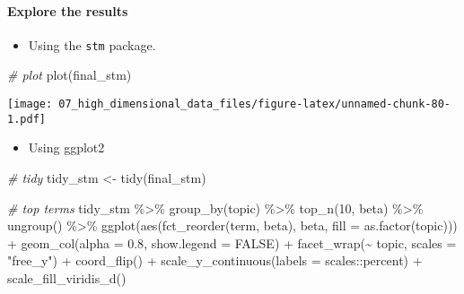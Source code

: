 \documentclass[
]{book}
\newenvironment{Shaded}{\begin{snugshade}}{\end{snugshade}}
\newcommand{\AttributeTok}[1]{\textcolor[rgb]{0.77,0.63,0.00}{#1}}
\newcommand{\CommentTok}[1]{\textcolor[rgb]{0.56,0.35,0.01}{\textit{#1}}}
\newcommand{\ConstantTok}[1]{\textcolor[rgb]{0.00,0.00,0.00}{#1}}
\newcommand{\DecValTok}[1]{\textcolor[rgb]{0.00,0.00,0.81}{#1}}
\newcommand{\FloatTok}[1]{\textcolor[rgb]{0.00,0.00,0.81}{#1}}
\newcommand{\FunctionTok}[1]{\textcolor[rgb]{0.00,0.00,0.00}{#1}}
\newcommand{\NormalTok}[1]{#1}
\newcommand{\OtherTok}[1]{\textcolor[rgb]{0.56,0.35,0.01}{#1}}
\newcommand{\SpecialCharTok}[1]{\textcolor[rgb]{0.00,0.00,0.00}{#1}}
\newcommand{\StringTok}[1]{\textcolor[rgb]{0.31,0.60,0.02}{#1}}
\providecommand{\tightlist}{%
  \setlength{\itemsep}{0pt}\setlength{\parskip}{0pt}}
\begin{document}
\hypertarget{explore-the-results}{%
\paragraph{Explore the results}\label{explore-the-results}}

\begin{itemize}
\tightlist
\item
  Using the \texttt{stm} package.
\end{itemize}

\begin{Shaded}
\begin{Highlighting}[]
\CommentTok{\# plot}
\FunctionTok{plot}\NormalTok{(final\_stm)}
\end{Highlighting}
\end{Shaded}

\texttt{[image: 07\_high\_dimensional\_data\_files/figure-latex/unnamed-chunk-80-1.pdf]}

\begin{itemize}
\tightlist
\item
  Using ggplot2
\end{itemize}

\begin{Shaded}
\begin{Highlighting}[]
\CommentTok{\# tidy  }
\NormalTok{tidy\_stm }\OtherTok{\textless{}{-}} \FunctionTok{tidy}\NormalTok{(final\_stm)}

\CommentTok{\# top terms}
\NormalTok{tidy\_stm }\SpecialCharTok{\%\textgreater{}\%}
    \FunctionTok{group\_by}\NormalTok{(topic) }\SpecialCharTok{\%\textgreater{}\%}
    \FunctionTok{top\_n}\NormalTok{(}\DecValTok{10}\NormalTok{, beta) }\SpecialCharTok{\%\textgreater{}\%}
    \FunctionTok{ungroup}\NormalTok{() }\SpecialCharTok{\%\textgreater{}\%}
    \FunctionTok{ggplot}\NormalTok{(}\FunctionTok{aes}\NormalTok{(}\FunctionTok{fct\_reorder}\NormalTok{(term, beta), beta, }\AttributeTok{fill =} \FunctionTok{as.factor}\NormalTok{(topic))) }\SpecialCharTok{+}
    \FunctionTok{geom\_col}\NormalTok{(}\AttributeTok{alpha =} \FloatTok{0.8}\NormalTok{, }\AttributeTok{show.legend =} \ConstantTok{FALSE}\NormalTok{) }\SpecialCharTok{+}
    \FunctionTok{facet\_wrap}\NormalTok{(}\SpecialCharTok{\textasciitilde{}}\NormalTok{ topic, }\AttributeTok{scales =} \StringTok{"free\_y"}\NormalTok{) }\SpecialCharTok{+}
    \FunctionTok{coord\_flip}\NormalTok{() }\SpecialCharTok{+}
    \FunctionTok{scale\_y\_continuous}\NormalTok{(}\AttributeTok{labels =}\NormalTok{ scales}\SpecialCharTok{::}\NormalTok{percent) }\SpecialCharTok{+}
    \FunctionTok{scale\_fill\_viridis\_d}\NormalTok{()}
\end{Highlighting}
\end{Shaded}
\end{document}
